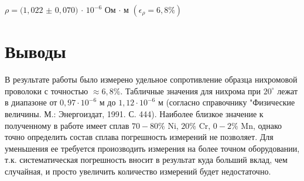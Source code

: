\documentclass[a4paper]{article}
\begin{document}
$\rho = (1,022$ $\pm$ $0,070)$ $\cdot$ $10^{-6}$ Ом $\cdot$ м $(\epsilon_\rho = 6,8 \%)$

\section{Выводы}
В результате работы было измерено удельное сопротивление образца нихромовой проволоки с точностью $\approx 6,8 \%$. Табличные значения для нихрома при $20^{\circ}$ лежат в диапазоне от $0,97 \cdot 10^{-6}$ м до $1,12 \cdot 10^{-6}$ м (согласно справочнику "Физические величины. М.: Энергоиздат, 1991. С. 444). Наиболее близкое значение к полученному в работе имеет сплав $70-80\%$ Ni, $ 20\%$ Cr, $0-2\%$ Mn, однако точно определить состав сплава погрешность измерений не позволяет. Для уменьшения ее требуется проиозводить измерения на более точном оборудовании, т.к. систематическая погрешность вносит в результат куда больший вклад, чем случайная, и просто увеличить количество измерений будет недостаточно.
\end{document}
